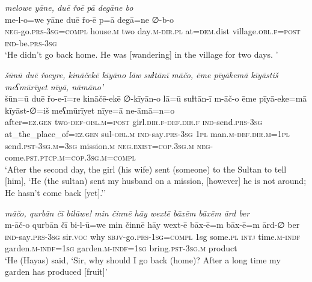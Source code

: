 \ea \label{ŽH.109}
\textit{melowe yāne, duē řoē pā degāne bo} \\ 
\gll me-l-o=we yāne duē řo-ē p=ā degā=ne ∅-b-o \\ 
 \textsc{neg-}go\textsc{.prs}\textsc{-3sg}\textsc{=compl} house\textsc{.m} two day\textsc{.m}\textsc{-dir}\textsc{.pl} at\textsc{=dem}.dist village\textsc{.obl}\textsc{\textsc{.f}}\textsc{=\textsc{post}} \textsc{ind-}be\textsc{.prs}\textsc{-3sg} \\ 
\glt `He didn’t go back home. He was [wandering] in the village for two days. '
\z 
 
\ea \label{ŽH.110}
\textit{šūnū duē řoeyre, kināčekē kīyāno lāw suɫtānī māčo, ēme pīyākemā kīyāstiš meʕmūrīyet nīyā, nāmāno’} \\ 
\gll šūn=ū duē řo-e-ī=re kināčē-ekē ∅-kīyān-o lā=ū suɫtān-ī m-āč-o ēme pīyā-eke=mā kīyāst-∅=iš meʕmūrīyet nīye=ā ne-āmā=n=o \\ 
 after\textsc{=ez}\textsc{.gen} two\textsc{-def}\textsc{-obl}\textsc{.m}\textsc{=\textsc{post}} girl\textsc{.dir}\textsc{\textsc{.f}}\textsc{-def}\textsc{.dir}\textsc{\textsc{.f}} \textsc{ind-}send\textsc{.prs}\textsc{-3sg} at\_the\_place\_of\textsc{=ez}\textsc{.gen} sul\textsc{-obl}\textsc{.m} \textsc{ind-}say\textsc{.prs}\textsc{-3sg} \textsc{1pl} man\textsc{.m}\textsc{-def}\textsc{.dir}\textsc{.m}\textsc{=1pl} send\textsc{.pst}\textsc{-3sg}\textsc{.m}\textsc{=3sg} mission\textsc{.m} \textsc{\textsc{neg.}exist}\textsc{=cop}\textsc{.3sg}\textsc{.m} \textsc{neg-}come\textsc{.pst}\textsc{.ptcp}\textsc{.m}\textsc{=cop}\textsc{.3sg}\textsc{.m}\textsc{=compl} \\ 
\glt `After the second day, the girl (his wife) sent (someone) to the Sultan to tell [him], ‘He (the sultan) sent my husband on a mission, [however] he is not around; He hasn’t come back [yet].’'
\z 
 
\ea \label{ŽH.113}
\textit{māčo, qurbān čī bilūwe! min činnē hāy wextē bāxēm bāxēm ārd ber} \\ 
\gll m-āč-o qurbān čī bi-l-ū=we min činnē hāy wext-ē bāx-ē=m bāx-ē=m ārd-∅ ber \\ 
 \textsc{ind-}say\textsc{.prs}\textsc{-3sg} sir.\textsc{voc} why \textsc{sbjv-}go\textsc{.prs}\textsc{-1sg}\textsc{=compl} 1sg some\textsc{.pl} \textsc{intj} time\textsc{.m}\textsc{-indf} garden\textsc{.m}\textsc{-indf}\textsc{=1sg} garden\textsc{.m}\textsc{-indf}\textsc{=1sg} bring\textsc{.pst}\textsc{-3sg}\textsc{.m} product \\ 
\glt `He (Hayas) said, ‘Sir, why should I go back (home)? After a long time my garden has produced [fruit]'
\z 
 
